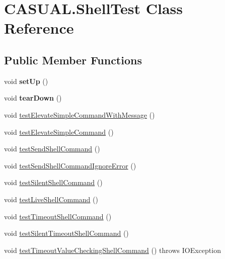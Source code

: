 \hypertarget{class_c_a_s_u_a_l_1_1_shell_test}{\section{C\-A\-S\-U\-A\-L.\-Shell\-Test Class Reference}
\label{class_c_a_s_u_a_l_1_1_shell_test}
}
\subsection*{Public Member Functions}
\begin{DoxyCompactItemize}
\item 
\hypertarget{class_c_a_s_u_a_l_1_1_shell_test_a7b0f3b279accbaa32eba9cc6a83e0aa5}{void {\bfseries set\-Up} ()}\label{class_c_a_s_u_a_l_1_1_shell_test_a7b0f3b279accbaa32eba9cc6a83e0aa5}

\item 
\hypertarget{class_c_a_s_u_a_l_1_1_shell_test_ac0248062c8be157b9cf76f8e81f719cb}{void {\bfseries tear\-Down} ()}\label{class_c_a_s_u_a_l_1_1_shell_test_ac0248062c8be157b9cf76f8e81f719cb}

\item 
void \hyperlink{class_c_a_s_u_a_l_1_1_shell_test_ad4d35d96dcf733d63b63fb61751d59c9}{test\-Elevate\-Simple\-Command\-With\-Message} ()
\item 
void \hyperlink{class_c_a_s_u_a_l_1_1_shell_test_ad4a1a5253daaa028680f982e556d08b4}{test\-Elevate\-Simple\-Command} ()
\item 
void \hyperlink{class_c_a_s_u_a_l_1_1_shell_test_afa6d9d0b8f4ee681dc728bcc94bf78b9}{test\-Send\-Shell\-Command} ()
\item 
void \hyperlink{class_c_a_s_u_a_l_1_1_shell_test_adf73783162e06a1eeb44770b755bbb2c}{test\-Send\-Shell\-Command\-Ignore\-Error} ()
\item 
void \hyperlink{class_c_a_s_u_a_l_1_1_shell_test_a94fc5a0d1aa1bad2e14e43f9240d3a2c}{test\-Silent\-Shell\-Command} ()
\item 
void \hyperlink{class_c_a_s_u_a_l_1_1_shell_test_a0cb22c494911e86073b2f45596154f7c}{test\-Live\-Shell\-Command} ()
\item 
void \hyperlink{class_c_a_s_u_a_l_1_1_shell_test_a10ba3fe1b54a165637677c17fde188ba}{test\-Timeout\-Shell\-Command} ()
\item 
void \hyperlink{class_c_a_s_u_a_l_1_1_shell_test_a297c2e2d65b7c997239b91cfb23d302b}{test\-Silent\-Timeout\-Shell\-Command} ()
\item 
void \hyperlink{class_c_a_s_u_a_l_1_1_shell_test_af5c1b28fac5ae5de71a4cda18d2a9f07}{test\-Timeout\-Value\-Checking\-Shell\-Command} ()  throws I\-O\-Exception 
\end{DoxyCompactItemize}
